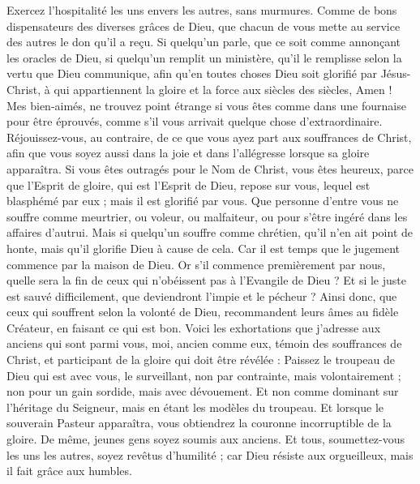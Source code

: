 \begin{multicols}{2}
Exercez l’hospitalité les uns envers les autres, sans murmures.
Comme de bons dispensateurs des diverses grâces de Dieu, que chacun de vous mette au service des autres le don qu'il a reçu.
Si quelqu'un parle, que ce soit comme annonçant les oracles de Dieu, si quelqu'un remplit un ministère, qu'il le remplisse selon la vertu que Dieu communique, afin qu'en toutes choses Dieu soit glorifié par Jésus-Christ, à qui appartiennent la gloire et la force aux siècles des siècles, Amen !
Mes bien-aimés, ne trouvez point étrange si vous êtes comme dans une fournaise pour être éprouvés, comme s’il vous arrivait quelque chose d'extraordinaire.
Réjouissez-vous, au contraire, de ce que vous ayez part aux souffrances de Christ, afin que vous soyez aussi dans la joie et dans l’allégresse lorsque sa gloire apparaîtra.
Si vous êtes outragés pour le Nom de Christ, vous êtes heureux, parce que l'Esprit de gloire, qui est l’Esprit de Dieu, repose sur vous, lequel est blasphémé par eux ; mais il est glorifié par vous.
Que personne d’entre vous ne souffre comme meurtrier, ou voleur, ou malfaiteur, ou pour s’être ingéré dans les affaires d'autrui.
Mais si quelqu'un souffre comme chrétien, qu'il n'en ait point de honte, mais qu'il glorifie Dieu à cause de cela.
Car il est temps que le jugement commence par la maison de Dieu{}. Or s'il commence premièrement par nous, quelle sera la fin de ceux qui n'obéissent pas à l'Evangile de Dieu ?
Et si le juste est sauvé difficilement, que deviendront l’impie et le pécheur ?
Ainsi donc, que ceux qui souffrent selon la volonté de Dieu, recommandent leurs âmes au fidèle Créateur, en faisant ce qui est bon.
\VerseOne{}Voici les exhortations que j’adresse aux anciens qui sont parmi vous, moi, ancien comme eux, témoin des souffrances de Christ, et participant de la gloire qui doit être révélée :
Paissez le troupeau de Dieu qui est avec vous, le surveillant, non par contrainte, mais volontairement ; non pour un gain sordide, mais avec dévouement.
Et non comme dominant sur l’héritage du Seigneur, mais en étant les modèles du troupeau.
Et lorsque le souverain Pasteur{} apparaîtra, vous obtiendrez la couronne incorruptible de la gloire.
De même, jeunes gens soyez soumis aux anciens. Et tous, soumettez-vous les uns les autres, soyez revêtus d’humilité ; car Dieu résiste aux orgueilleux, mais il fait grâce aux humbles.

\end{multicols}
